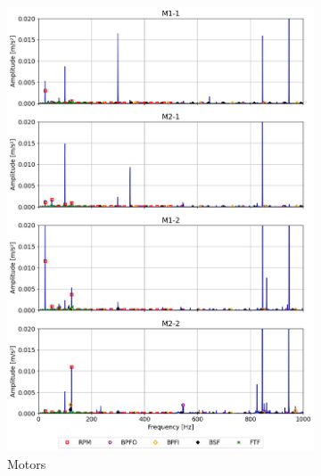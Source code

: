 \begin{figure}[h]
    \centering
    \begin{subfigure}[b]{0.24\textwidth}
        \includegraphics[width=\textwidth]{assets/results/defects/motors.png}
        \caption{Motors}
    \end{subfigure}
    \hfill
    \begin{subfigure}[b]{0.24\textwidth}

\end{subfigure}
\end{figure}
